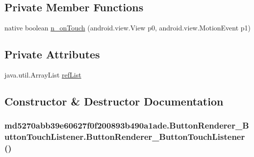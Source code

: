 \subsection*{Private Member Functions}
\begin{CompactItemize}
\item 
native boolean \hyperlink{classmd5270abb39e60627f0f200893b490a1ade_1_1_button_renderer___button_touch_listener_951a6425ee250bcf07b10cc8bd2d9ac8}{n\_\-onTouch} (android.view.View p0, android.view.MotionEvent p1)
\end{CompactItemize}
\subsection*{Private Attributes}
\begin{CompactItemize}
\item 
java.util.ArrayList \hyperlink{classmd5270abb39e60627f0f200893b490a1ade_1_1_button_renderer___button_touch_listener_f5f607b9a9d4a05bc95dc8d268c17216}{refList}
\end{CompactItemize}


\subsection{Constructor \& Destructor Documentation}
\hypertarget{classmd5270abb39e60627f0f200893b490a1ade_1_1_button_renderer___button_touch_listener_dd0dff031ed4ad0bfd0aca3742dd9cd7}{
\subsubsection[{ButtonRenderer\_\-ButtonTouchListener}]{\setlength{\rightskip}{0pt plus 5cm}md5270abb39e60627f0f200893b490a1ade.ButtonRenderer\_\-ButtonTouchListener.ButtonRenderer\_\-ButtonTouchListener ()}}
\label{classmd5270abb39e60627f0f200893b490a1ade_1_1_button_renderer___button_touch_listener_dd0dff031ed4ad0bfd0aca3742dd9cd7}




